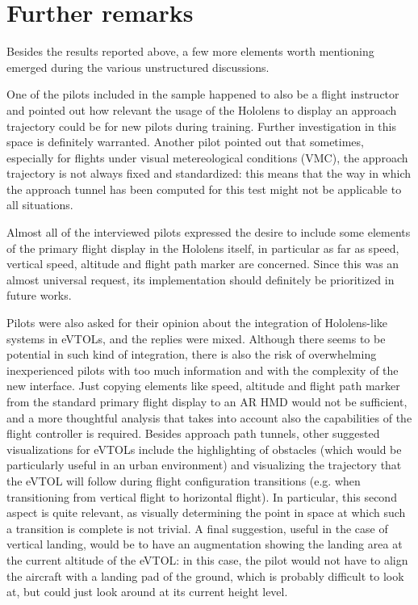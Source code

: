\section{Further remarks}\label{sec:final_remarks}

Besides the results reported above, a few more elements worth mentioning emerged during the various unstructured discussions.

One of the pilots included in the sample happened to also be a flight instructor and pointed out how relevant the usage of the Hololens to display an approach trajectory could be for new pilots during training. Further investigation in this space is definitely warranted. Another pilot pointed out that sometimes, especially for flights under visual metereological conditions (VMC), the approach trajectory is not always fixed and standardized: this means that the way in which the approach tunnel has been computed for this test might not be applicable to all situations.

Almost all of the interviewed pilots expressed the desire to include some elements of the primary flight display in the Hololens itself, in particular as far as speed, vertical speed, altitude and flight path marker are concerned. Since this was an almost universal request, its implementation should definitely be prioritized in future works.

Pilots were also asked for their opinion about the integration of Hololens-like systems in \glspl{eVTOL}, and the replies were mixed. Although there seems to be potential in such kind of integration, there is also the risk of overwhelming inexperienced pilots with too much information and with the complexity of the new interface. Just copying elements like speed, altitude and flight path marker from the standard primary flight display to an \gls{AR} \gls{HMD} would not be sufficient, and a more thoughtful analysis that takes into account also the capabilities of the flight controller is required. Besides approach path tunnels, other suggested visualizations for \glspl{eVTOL} include the highlighting of obstacles (which would be particularly useful in an urban environment) and visualizing the trajectory that the \gls{eVTOL} will follow during flight configuration transitions (e.g. when transitioning from vertical flight to horizontal flight). In particular, this second aspect is quite relevant, as visually determining the point in space at which such a transition is complete is not trivial. A final suggestion, useful in the case of vertical landing, would be to have an augmentation showing the landing area at the current altitude of the \gls{eVTOL}: in this case, the pilot would not have to align the aircraft with a landing pad of the ground, which is probably difficult to look at, but could just look around at its current height level.

